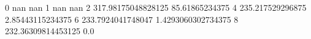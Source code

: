 0 nan nan
1 nan nan
2 317.98175048828125 85.61865234375
4 235.217529296875 2.85443115234375
6 233.7924041748047 1.4293060302734375
8 232.36309814453125 0.0
